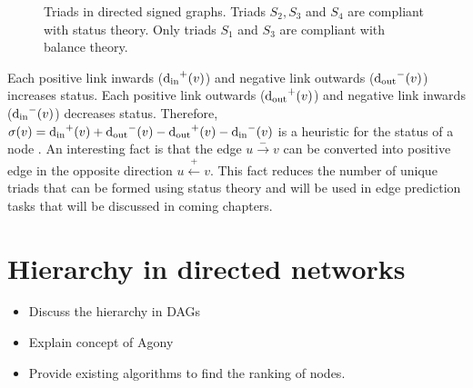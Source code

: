 \begin{figure}[!ht] 
    \centering
    
    \caption{Triads in directed signed graphs. Triads $S_2,S_3$ and $S_4$ are compliant with status theory. Only triads $S_1$ and $S_3$ are compliant with balance theory.}
    \label{fig:status-triads}
\end{figure}

Each positive link inwards ($\operatorname*{d_{\text{in}}}^{+}(v)$) and negative link outwards ($\operatorname*{d_{\text{out}}}^{-}(v)$) increases status. Each positive link outwards ($\operatorname*{d_{\text{out}}}^{+}(v)$) and negative link inwards ($\operatorname*{d_{\text{in}}}^{-}(v)$) decreases status. Therefore, $\sigma(v) = \operatorname*{d_{\text{in}}}^{+}(v) + \operatorname*{d_{\text{out}}}^{-}(v) - \operatorname*{d_{\text{out}}}^{+}(v)- \operatorname*{d_{\text{in}}}^{-}(v)$ is a heuristic for the status of a node \cite{leskovec2010predicting}. An interesting fact is that the edge $u \xrightarrow{-} v$ can be converted into positive edge in the opposite direction $u \xleftarrow{+} v$. This fact reduces the number of unique triads that can be formed using status theory and will be used in edge prediction tasks that will be discussed in coming chapters.

\section{Hierarchy in directed networks}
\label{sec:hierarchy}
\begin{itemize}
    \item Discuss the hierarchy in DAGs
    \item Explain concept of Agony
    \item Provide existing algorithms to find the ranking of nodes.
\end{itemize}